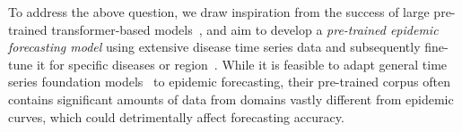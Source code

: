 

To address the above question, we draw inspiration from the success of large pre-trained transformer-based models~\cite{zhao2023survey}, and aim to develop a \textit{pre-trained epidemic forecasting model} using extensive disease time series data and subsequently fine-tune it for specific diseases or region~\cite{kamarthi2023pems}. 
While it is feasible to adapt general time series foundation models~\cite{liang2024foundation, ma2024survey} to epidemic forecasting, their pre-trained corpus often contains significant amounts of data from domains vastly different from epidemic curves, which could detrimentally affect forecasting accuracy. 

